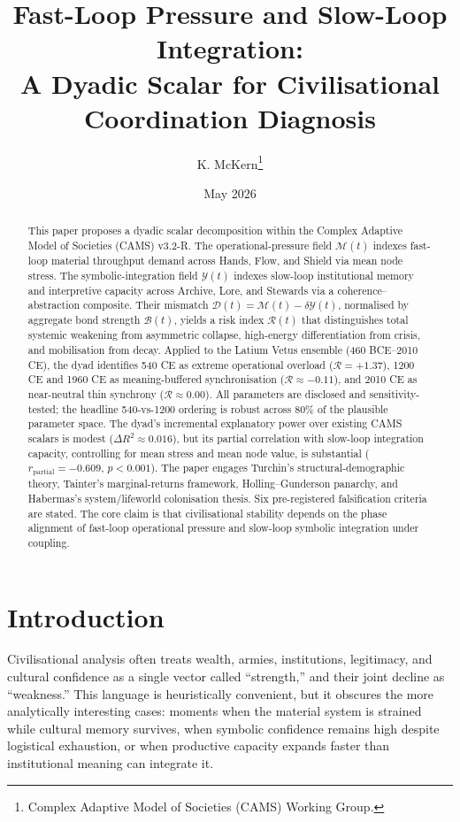 \documentclass[11pt,a4paper]{article}
\title{Fast-Loop Pressure and Slow-Loop Integration:\\A Dyadic Scalar for Civilisational Coordination Diagnosis}
\author{K. McKern\thanks{Complex Adaptive Model of Societies (CAMS) Working Group.}}
\date{May 2026}
\begin{document}
\maketitle

\begin{abstract}
This paper proposes a dyadic scalar decomposition within the Complex Adaptive Model of Societies (CAMS) v3.2-R. The operational-pressure field \(\mathcal{M}(t)\) indexes fast-loop material throughput demand across Hands, Flow, and Shield via mean node stress. The symbolic-integration field \(\mathcal{Y}(t)\) indexes slow-loop institutional memory and interpretive capacity across Archive, Lore, and Stewards via a coherence--abstraction composite. Their mismatch \(\mathcal{D}(t)=\mathcal{M}(t)-\delta\mathcal{Y}(t)\), normalised by aggregate bond strength \(\mathcal{B}(t)\), yields a risk index \(\mathcal{R}(t)\) that distinguishes total systemic weakening from asymmetric collapse, high-energy differentiation from crisis, and mobilisation from decay. Applied to the Latium Vetus ensemble (460 BCE--2010 CE), the dyad identifies 540 CE as extreme operational overload (\(\mathcal{R}=+1.37\)), 1200 CE and 1960 CE as meaning-buffered synchronisation (\(\mathcal{R}\approx-0.11\)), and 2010 CE as near-neutral thin synchrony (\(\mathcal{R}\approx0.00\)). All parameters are disclosed and sensitivity-tested; the headline 540-vs-1200 ordering is robust across 80\% of the plausible parameter space. The dyad's incremental explanatory power over existing CAMS scalars is modest (\(\Delta R^2\approx0.016\)), but its partial correlation with slow-loop integration capacity, controlling for mean stress and mean node value, is substantial (\(r_{\text{partial}}=-0.609\), \(p<0.001\)). The paper engages Turchin's structural-demographic theory, Tainter's marginal-returns framework, Holling--Gunderson panarchy, and Habermas's system/lifeworld colonisation thesis. Six pre-registered falsification criteria are stated. The core claim is that civilisational stability depends on the phase alignment of fast-loop operational pressure and slow-loop symbolic integration under coupling.
\end{abstract}

\section{Introduction}
Civilisational analysis often treats wealth, armies, institutions, legitimacy, and cultural confidence as a single vector called ``strength,'' and their joint decline as ``weakness.'' This language is heuristically convenient, but it obscures the more analytically interesting cases: moments when the material system is strained while cultural memory survives, when symbolic confidence remains high despite logistical exhaustion, or when productive capacity expands faster than institutional meaning can integrate it.
\end{document}
